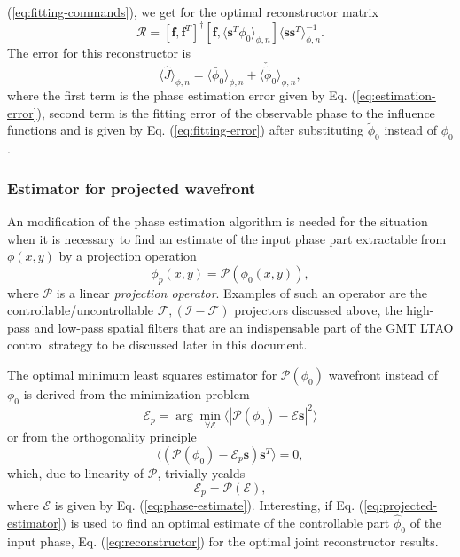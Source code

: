 (\ref{eq:fitting-commands}), we get for the optimal reconstructor matrix
\begin{equation} \label{eq:reconstructor}
	\mathcal{R} = [\bm{f},\bm{f}^{T}]^{\dagger}
	              [\bm{f}, \langle \bm{s}^{T} \phi_{0} \rangle_{\phi,n} ]
	              \langle \bm{s} \bm{s}^{T} \rangle_{\phi,n}^{-1}.
\end{equation}
The error for this reconstructor is
\begin{equation} \label{eq:reconstruction-error}
	\langle \hat{J} \rangle_{\phi,n} =
	\langle \bar{\phi}_{0} \rangle_{\phi,n} +
	\langle \check{\tilde{\phi}}_{0} \rangle_{\phi,n},
\end{equation}
where the first term is the phase estimation error given by Eq.
(\ref{eq:estimation-error}), second term is the fitting error of the
observable phase to the influence functions and is given by Eq.
(\ref{eq:fitting-error}) after substituting $\tilde{\phi}_{0}$ instead of
$\phi_{0}$.

\subsubsection{Estimator for projected wavefront}

An modification of the phase estimation algorithm is needed for the situation
when it is necessary to find an estimate of the input phase part extractable
from $\phi(x,y)$ by a projection operation
\begin{equation} \label{eq:projection}
	\phi_{p}(x,y) = \mathcal{P} ( \phi_{0} (x,y) ),
\end{equation}
where $\mathcal{P}$ is a linear \emph{projection operator}.  Examples of such an operator are the controllable/uncontrollable
$\mathcal{F,(I-F)}$
projectors discussed above, the high-pass and low-pass spatial filters that
are an indispensable part of the GMT LTAO control strategy to be discussed later
in this document.

The optimal minimum least squares estimator for
$\mathcal{P} (\phi_{0})$  wavefront
instead of $\phi_{0}$ is derived from the minimization problem
\begin{equation} \label{eq:projected-estimation}
	\mathcal{E}_{p} = \arg \min_{\forall \mathcal{E}}
	                  \langle |\mathcal{P} (\phi_{0}) -
	                           \mathcal{E} \bm{s}|^{2} \rangle
\end{equation}
or from the orthogonality principle
\begin{equation} \label{eq:projected-estimator-orthogonality-principle}
	\langle (\mathcal{P} (\phi_{0}) -
	         \mathcal{E}_{p} \bm{s}) \bm{s}^{T} \rangle = 0,
\end{equation}
which, due to linearity of $\mathcal{P}$, trivially yealds
\begin{equation} \label{eq:projected-estimator}
	\mathcal{E}_{p} = \mathcal{P(E)},
\end{equation}
where $\mathcal{E}$ is given by Eq. (\ref{eq:phase-estimate}). Interesting,
if Eq. (\ref{eq:projected-estimator}) is used to find an optimal estimate
of the controllable part $\hat{\phi}_{0}$ of the input phase, Eq.
(\ref{eq:reconstructor}) for the optimal joint reconstructor results.

